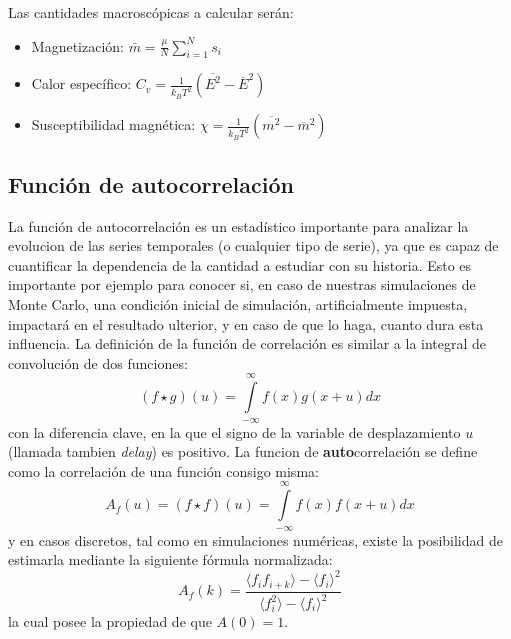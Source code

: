 \documentclass[a4paper,10pt]{paper}
\begin{document}
 Las cantidades macrosc\'opicas a calcular ser\'an:
 \begin{itemize}
  \item Magnetizaci\'on: $\bar{m} = \frac{\mu}{N} \sum\limits_{i=1}^{N} s_i$
  \item Calor espec\'ifico: $C_v = \frac{1}{k_B T^2}(\overline{E^2} -\overline{E}^2)$
  \item Susceptibilidad magn\'etica: $\chi = \frac{1}{k_B T^2}(\overline{m^2} -\overline{m}^2)$
 \end{itemize}

 \subsection{Funci\'on de autocorrelaci\'on}
 La funci\'on de autocorrelaci\'on es un estad\'istico importante para analizar la evolucion de las 
 series temporales (o cualquier tipo de serie), ya que es capaz de cuantificar la dependencia de la
 cantidad a estudiar con su historia. 
 Esto es importante por ejemplo para conocer si, en caso de nuestras simulaciones de Monte Carlo, una
 condici\'on inicial de simulaci\'on, artificialmente impuesta, impactar\'a en el resultado ulterior, 
 y en caso de que lo haga, cuanto dura esta influencia.
 La definici\'on de la funci\'on de correlaci\'on es similar a la integral de convoluci\'on de dos funciones:
\begin{displaymath} 
 (f \star g)(u) = \int\limits_{-\infty}^{\infty}f(x)g(x+u)dx
\end{displaymath}
 con la diferencia clave, en la que el signo de la variable de desplazamiento $u$ (llamada tambien \textit{delay})
 es positivo.
 La funcion de \textbf{auto}correlaci\'on se define como la correlaci\'on de una funci\'on consigo misma:
 \begin{displaymath} 
 A_f(u) = (f \star f)(u) = \int\limits_{-\infty}^{\infty}f(x)f(x+u)dx
\end{displaymath}
 y en casos discretos, tal como en simulaciones num\'ericas, existe la posibilidad de estimarla mediante la 
 siguiente f\'ormula normalizada:
 \begin{displaymath} 
 A_f(k) = \frac{\langle f_i f_{i+k} \rangle - \langle f_i\rangle^2}{\langle f_i^2 \rangle - \langle f_i\rangle^2}
\end{displaymath}
 la cual posee la propiedad de que $A(0)=1$. 
 
\end{document}
